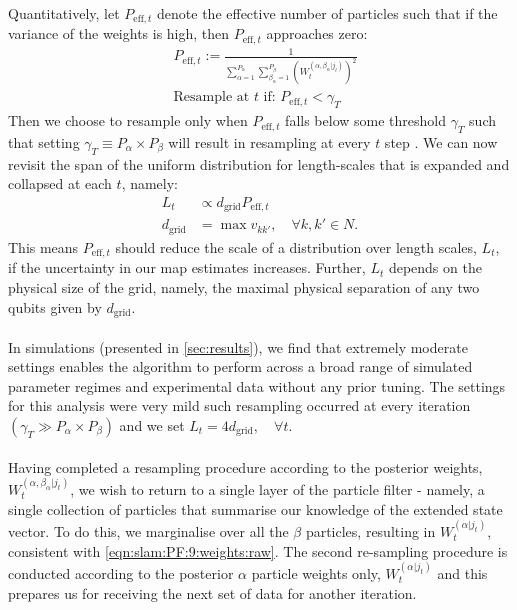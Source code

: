 Quantitatively, let $P_{\mathrm{eff},t}$ denote the effective number of particles such that if the variance of the weights is high, then $P_{\mathrm{eff},t}$ approaches zero:
\begin{align}
& P_{\mathrm{eff},t} := \frac{1}{\sum_{\alpha=1}^{P_\alpha} \sum_{\beta_\alpha=1}^{P_\beta} \left( W_t^{(\alpha, \beta_\alpha | j_t)} \right)^2} \label{eqn:slam:PF:11} \\
&\textrm{Resample at $t$ if:  }  P_{\mathrm{eff},t} < \gamma_{T}  \label{eqn:slam:PF:12}
\end{align}Then we choose to resample only when $P_{\mathrm{eff},t}$ falls below some threshold $\gamma_{T}$ such that setting $\gamma_{T} \equiv P_\alpha \times P_\beta$ will result in resampling at every $t$ step \cite{li2015resampling}. We can now revisit the span of the uniform distribution for length-scales that is expanded and collapsed at each $t$, namely:
\begin{align}
L_t & \propto  d_{\mathrm{grid}} P_{\mathrm{eff}, t} \label{eqn:slam:PF:13}\\  
d_{\mathrm{grid}} &= \max v_{k k'}, \quad \forall k, k' \in N. \label{eqn:slam:PF:14}
\end{align}
This means $P_{\mathrm{eff}, t} $ should reduce the  scale of a distribution over length scales, $L_t$, if the uncertainty in our map estimates increases. Further, $L_t$ depends on the physical size of the grid, namely, the maximal physical separation of any two qubits given by $d_{\mathrm{grid}}$. \\
\\
In simulations (presented in \cref{sec:results}), we find that extremely moderate settings enables the algorithm to perform across a broad range of simulated parameter regimes and experimental data without any prior tuning. The settings for this analysis were very mild such resampling occurred at every iteration $(\gamma_T \gg P_\alpha \times P_\beta )$ and we set $L_t = 4 d_{\mathrm{grid}}, \quad \forall t$. \\
\\
Having completed a resampling procedure according to the posterior weights, $ W_t^{(\alpha, \beta_\alpha | j_t)}$, we wish to return to a single layer of the particle filter - namely, a single collection of particles that summarise our knowledge of the extended state vector. To do this, we marginalise over all the $\beta$ particles, resulting in  $W_t^{(\alpha | j_t)} $, consistent with \cref{eqn:slam:PF:9:weights:raw}. The second re-sampling procedure is conducted according to the posterior $\alpha$ particle weights only, $ W_t^{(\alpha| j_t)}$ and this prepares us for receiving the next set of data for another iteration.  \\
